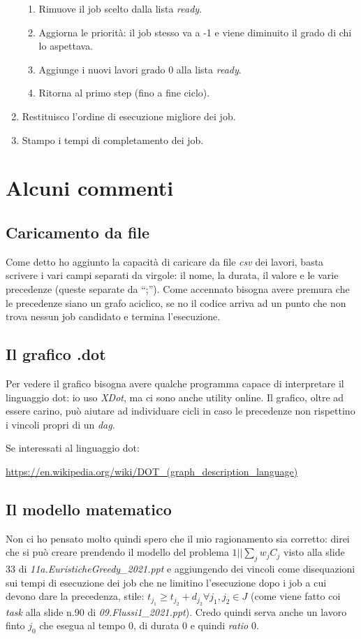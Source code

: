 \documentclass[12pt, letterpaper]{article}
\begin{document}
\begin{enumerate}
{\begin{enumerate}
\item{Rimuove il job scelto dalla lista \textit{ready}.}
\item{Aggiorna le priorità: il job stesso va a -1 e viene diminuito il grado di chi lo aspettava.}
\item{Aggiunge i nuovi lavori grado 0 alla lista \textit{ready}.} 
\item{Ritorna al primo step (fino a fine ciclo).}
\end{enumerate}}
\item{Restituisco l'ordine di esecuzione migliore dei job.}
\item{Stampo i tempi di completamento dei job.}
\end{enumerate}

\section{Alcuni commenti}

\subsection{Caricamento da file}
Come detto ho aggiunto la capacità di caricare da file \textit{csv} dei lavori, basta scrivere i vari campi separati da virgole: il nome, la durata, il valore e le varie precedenze (queste separate da ``;'').
Come accennato bisogna avere premura che le precedenze siano un grafo aciclico, se no il codice arriva ad un punto che non trova nessun job candidato e termina l'esecuzione.
\subsection{Il grafico .dot}
Per vedere il grafico bisogna avere qualche programma capace di interpretare il linguaggio dot: io uso \textit{XDot}, ma ci sono anche utility online.
Il grafico, oltre ad essere carino, può aiutare ad individuare cicli in caso le precedenze non rispettino i vincoli propri di un \textit{dag}.

Se interessati al linguaggio dot:

\medskip
\url{https://en.wikipedia.org/wiki/DOT_(graph_description_language)}

\subsection{Il modello matematico}
Non ci ho pensato molto quindi spero che il mio ragionamento sia corretto: direi che si può creare prendendo il modello del problema $1||\sum_j w_j C_j$ visto alla slide 33 di \textit{11a.EuristicheGreedy\_2021.ppt} e aggiungendo dei vincoli come disequazioni sui tempi di esecuzione dei job che ne limitino l'esecuzione dopo i job a cui devono dare la precedenza, stile: $t_{j_1} \geq t_{j_2} + d_{j_2} \forall j_1,j_2 \in J$ (come viene fatto coi \textit{task} alla slide n.90 di \textit{09.Flussi1\_2021.ppt}). Credo quindi serva anche un lavoro finto $j_0$ che esegua al tempo 0, di durata 0 e quindi \textit{ratio} 0.
\end{document}
